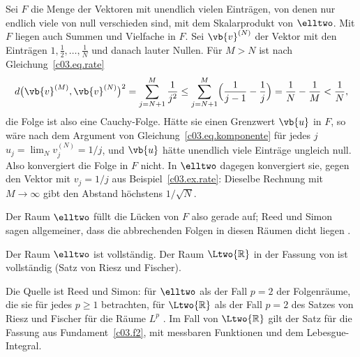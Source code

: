 \begin{fundament}
  \begin{example}\label{c03.ex.endlich}
    Sei $F$ die Menge der Vektoren mit unendlich vielen Einträgen, von denen nur endlich
    viele von null verschieden sind, mit dem Skalarprodukt von $\elltwo$. Mit $F$ liegen
    auch Summen und Vielfache in $F$. Sei $\vb{v}^{(N)}$ der Vektor mit den Einträgen
    $1, \tfrac12, \dots, \tfrac1N$ und danach lauter Nullen. Für $M > N$ ist nach
    Gleichung~\eqref{c03.eq.rate}
    \begin{equation}\label{c03.eq.endlich}
      d\bigl(\vb{v}^{(M)}, \vb{v}^{(N)}\bigr)^2
      = \sum_{j=N+1}^{M} \frac{1}{j^2}
      \leq \sum_{j=N+1}^{M} \Bigl( \frac{1}{j-1} - \frac{1}{j} \Bigr)
      = \frac{1}{N} - \frac{1}{M} < \frac{1}{N} ,
    \end{equation}
    die Folge ist also eine Cauchy-Folge. Hätte sie einen Grenzwert $\vb{u}$ in $F$, so wäre
    nach dem Argument von Gleichung~\eqref{c03.eq.komponente} für jedes $j$
    $u_j = \lim_{N} v_j^{(N)} = 1/j$, und $\vb{u}$ hätte unendlich viele Einträge ungleich
    null. Also konvergiert die Folge in $F$ nicht. In $\elltwo$ dagegen konvergiert sie,
    gegen den Vektor mit $v_j = 1/j$ aus Beispiel~\ref{c03.ex.rate}: Dieselbe Rechnung
    mit $M \to \infty$ gibt den Abstand höchstens $1/\sqrt{N}$.
  \end{example}

  Der Raum $\elltwo$ füllt die Lücken von $F$ also gerade auf; Reed und Simon sagen
  allgemeiner, dass die abbrechenden Folgen in diesen Räumen dicht liegen
  .

  \begin{theorem}\label{c03.thm.vollstaendig}
    Der Raum $\elltwo$ ist vollständig. Der Raum $\Ltwo{\mathbb{R}}$ in der Fassung von
     ist vollständig (Satz von Riesz und Fischer).
  \end{theorem}

  Die Quelle ist Reed und Simon: für $\elltwo$ als der Fall $p = 2$ der Folgenräume, die
  sie für jedes $p \geq 1$ betrachten, für $\Ltwo{\mathbb{R}}$ als der Fall $p = 2$ des
  Satzes von Riesz und Fischer für die Räume $L^p$ . Im Fall von $\Ltwo{\mathbb{R}}$ gilt der
  Satz für die Fassung aus Fundament~\ref{c03.f2}, mit messbaren Funktionen und dem
  Lebesgue-Integral.


\end{fundament}
